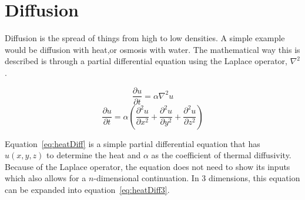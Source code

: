 \documentclass[12pt, letterpaper]{article}
\begin{document}
\section{Diffusion} \label{diffusion}

Diffusion is the spread of things from high to low densities. A simple example would be diffusion with heat,or
osmosis with water. The mathematical way this is described is through a partial
differential equation using the Laplace operator, $ \nabla^2 $.

\begin{equation}
  \frac{\partial u}{\partial t} = \alpha \nabla^2 u
  \label{eq:heatDiff}
\end{equation}
\begin{equation}
  \frac{\partial u}{\partial t} = \alpha (\frac{\partial^2 u}{\partial x^2} + \frac{\partial^2 u}{\partial
  y^2} + \frac{\partial^2 u}{\partial z^2})
  \label{eq:heatDiff3}
\end{equation}

Equation~\ref{eq:heatDiff} is a simple partial differential equation that has $u(x, y, z)$ 
to determine the heat and $\alpha$ as the coefficient of thermal diffusivity. Because of the Laplace
operator, the equation does not need to show its inputs which also allows for a $n$-dimensional continuation.
In 3 dimensions, this equation can be expanded into equation~\ref{eq:heatDiff3}.
\end{document}
